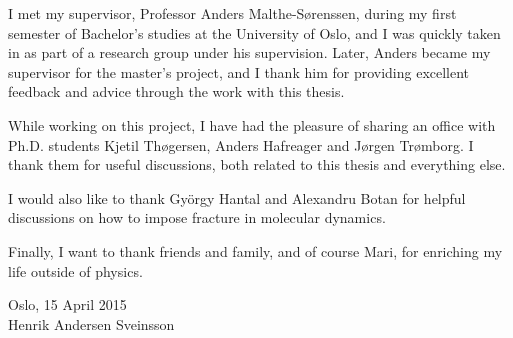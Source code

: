 \begin{acknowledgements}
I met my supervisor, Professor Anders Malthe-Sørenssen, during my first semester of Bachelor's studies at the University of Oslo, and I was quickly taken in as part of a research group under his supervision. Later, Anders became my supervisor for the master's project, and I thank him for providing excellent feedback and advice through the work with this thesis. 

While working on this project, I have had the pleasure of sharing an office with Ph.D. students Kjetil Thøgersen, Anders Hafreager and Jørgen Trømborg. I thank them for useful discussions, both related to this thesis and everything else. 

I would also like to thank Gy\"orgy Hantal and Alexandru Botan for helpful discussions on how to impose  fracture in molecular dynamics.

Finally, I want to thank friends and family, and of course Mari, for enriching my life outside of physics.
\begin{flushright}
Oslo, 15 April 2015 \\
Henrik Andersen Sveinsson
\end{flushright}
\end{acknowledgements}
